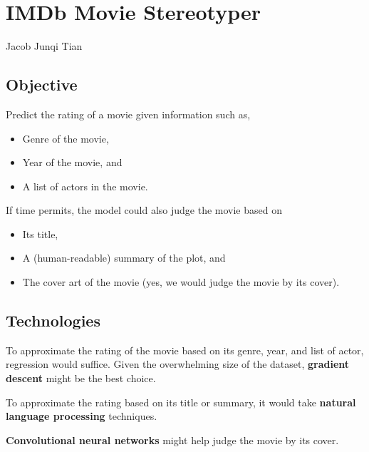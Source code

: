 \documentclass{article}
\theoremstyle{definition}
\theoremstyle{remark}
\begin{document}
\section*{IMDb Movie Stereotyper}
Jacob Junqi Tian

\subsection*{Objective}
Predict the rating of a movie given information such as, 
\begin{itemize}
    \item Genre of the movie,
    \item Year of the movie, and
    \item A list of actors in the movie.
\end{itemize}

If time permits, the model could also judge the movie based on 
\begin{itemize}
    \item Its title,
    \item A (human-readable) summary of the plot, and
    \item The cover art of the movie (yes, we would judge the movie by its cover).

\end{itemize}

\subsection*{Technologies}
To approximate the rating of the movie based on its genre, year, and list of actor, regression would suffice. Given the overwhelming size of the dataset, \textbf{gradient descent} might be the best choice.

To approximate the rating based on its title or summary, it would take \textbf{natural language processing} techniques.

\textbf{Convolutional neural networks} might help judge the movie by its cover.
\end{document}
